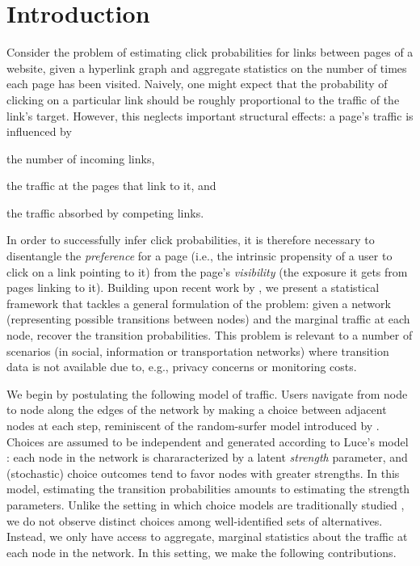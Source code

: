 \section{Introduction}  %
\label{cr:sec:intro}

Consider the problem of estimating click probabilities for links between pages of a website, given a hyperlink graph and aggregate statistics on the number of times each page has been visited.
Naively, one might expect that the probability of clicking on a particular link should be roughly proportional to the traffic of the link's target.
However, this neglects important structural effects:
a page's traffic is influenced by
\begin{enuminline}
\item the number of incoming links,
\item the traffic at the pages that link to it, and
\item the traffic absorbed by competing links.
\end{enuminline}
In order to successfully infer click probabilities, it is therefore necessary to disentangle the \emph{preference} for a page (i.e., the intrinsic propensity of a user to click on a link pointing to it) from the page's \emph{visibility} (the exposure it gets from pages linking to it).
Building upon recent work by \citet{kumar2015inverting}, we present a statistical framework that tackles a general formulation of the problem:
given a network (representing possible transitions between nodes) and the marginal traffic at each node, recover the transition probabilities.
This problem is relevant to a number of scenarios (in social, information or transportation networks) where transition data is not available due to, e.g., privacy concerns or monitoring costs.

We begin by postulating the following model of traffic.
Users navigate from node to node along the edges of the network by making a choice between adjacent nodes at each step, reminiscent of the random-surfer model introduced by \citet{brin1998anatomy}.
Choices are assumed to be independent and generated according to Luce's model \citep{luce1959individual}: each node in the network is chararacterized by a latent \emph{strength} parameter, and (stochastic) choice outcomes tend to favor nodes with greater strengths.
In this model, estimating the transition probabilities amounts to estimating the strength parameters.
Unlike the setting in which choice models are traditionally studied \citep{train2009discrete, vojnovic2016parameter}, we do not observe distinct choices among well-identified sets of alternatives.
Instead, we only have access to aggregate, marginal statistics about the traffic at each node in the network.
In this setting, we make the following contributions.

